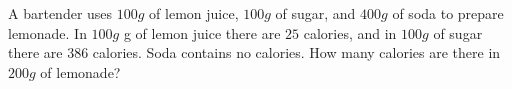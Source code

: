 A bartender uses $100g$ of lemon juice, $100g$ of sugar, and $400g$ of soda to prepare lemonade. In $100g$ g of lemon juice there are $25$ calories, and in $100g$ of sugar there are $386$ calories. Soda contains no calories. How many calories are there in $200g$ of lemonade?
